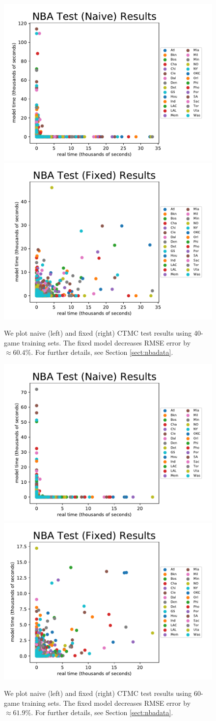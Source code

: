 \documentclass[review,letterpaper,11pt]{elsarticle}
\begin{document}
\begin{figure}[tbh]
\centering
\includegraphics[width=.45\textwidth]{NBA4060_colorplots/Naive_40games_test_new.pdf}
\includegraphics[width=.45\textwidth]{NBA4060_colorplots/fixed_40games_test_new.pdf}
\caption{We plot naive (left) and fixed (right) CTMC test results using 40-game training sets.  The fixed model decreases RMSE error by $\approx 60.4\%$.  For further details, see Section \ref{sect:nbadata}.}
\label{fig:naivefixed40}
\end{figure}

\begin{figure}[tbh]
\center
\includegraphics[width=.45\textwidth]{NBA4060_colorplots/Naive_60games_test_new.pdf}
\includegraphics[width=.45\textwidth]{NBA4060_colorplots/fixed_60games_test_new.pdf}
\caption{We plot naive (left) and fixed (right) CTMC test results using 60-game training sets.  The fixed model decreases RMSE error by $\approx 61.9\%$.  For further details, see Section \ref{sect:nbadata}.}
\label{fig:naivefixed60}
\end{figure}
\end{document}
